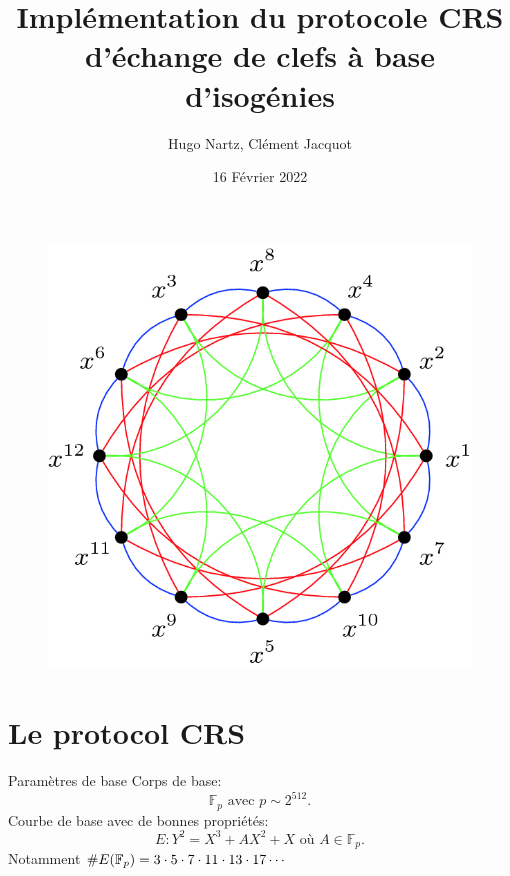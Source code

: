 \documentclass{beamer}
\title{Implémentation du protocole CRS d'échange de clefs à base d'isogénies }
\author{Hugo Nartz, Cl\'ement Jacquot}
\date{16 F\'evrier 2022}
\begin{document}
\begin{frame}
  \titlepage
\begin{figure}[h]
\centering
\includegraphics[scale=0.13]{../figs/isoGraph}
\end{figure}
\end{frame}

\begin{frame}{}
  \tableofcontents
\end{frame}

\section{Le protocol CRS}

\begin{frame}{Param\`etres de base}
	Corps de base:
	\[
		\mathbb{F}_p \text{ avec } p\sim 2^{512}.
	\]
	Courbe de base avec de bonnes propri\'et\'es:
	\[
		E: Y^2 = X^3 + AX^2 + X  \text{ o\`u } A\in  \mathbb{F}_p.
	\]
	Notamment $\# E(\mathbb{F}_p) = 3\cdot 5\cdot 7\cdot 11 \cdot 13\cdot 17\cdots$
\end{frame}
\end{document}
